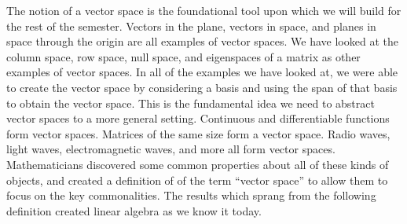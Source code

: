 The notion of a vector space is the foundational tool upon which we will build for the rest of the semester. Vectors in the plane, vectors in space, and planes in space through the origin are all examples of vector spaces. We have looked at the column space, row space, null space, and eigenspaces of a matrix as other examples of vector spaces.  In all of the examples we have looked at, we were able to create the vector space by considering a basis and using the span of that basis to obtain the vector space.  This is the fundamental idea we need to abstract vector spaces to a more general setting.  
Continuous and differentiable functions form vector spaces. Matrices of the same size form a vector space. Radio waves, light waves, electromagnetic waves, and more all form vector spaces. Mathematicians discovered some common properties about all of these kinds of objects, and created a definition of of the term ``vector space'' to allow them to focus on the key commonalities. The results which sprang from the following definition created linear algebra as we know it today. 

